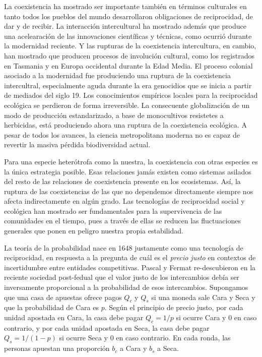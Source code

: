 \documentclass[a4paper,10pt]{book}
\theoremstyle{definition}
\begin{document}
La coexistencia ha mostrado ser importante tambi\'en en t\'erminos culturales en tanto todos los pueblos del mundo desarrollaron obligaciones de reciprocidad, de dar y de recibir.
%
La interacci\'on intercultural ha mostrado adem\'as que produce una acelearaci\'on de las innovaciones cient\'ificas y t\'ecnicas, como ocurri\'o durante la modernidad reciente.
%
Y las rupturas de la coexistencia intercultura, en cambio, han mostrado que producen procesos de involuci\'on cultural, como los registrados en Tasmania y en Europa occidental durante la Edad Media.
%
El proceso colonial asociado a la modernidad fue produciendo una ruptura de la coexistencia intercultral, especialmente aguda durante la era genocidios que se inicia a partir de mediados del siglo 19.
% 
Los conocimientos emp\'iricos locales para la reciprocidad ecol\'ogica se perdieron de forma irreversible.
%
La consecuente globalizaci\'on de un modo de producci\'on estandarizado, a base de monocultivos resistetes a herbicidas, est\'a produciendo ahora una ruptura de la coexistencia ecol\'ogica.
%
A pesar de todos los avances, la ciencia metropolitana moderna no es capaz de revertir la masiva p\'erdida biodiversidad actual.


Para una especie heter\'otrofa como la nuestra, la coexistencia con otras especies es la única estrategia posible.
%
Esas relaciones jam\'as existen como sistemas asilados del resto de las relaciones de coexistencia presente en los ecosistemas.
%
As\'i, la ruptura de las coexistencias de las que no dependemos directamente siempre nos afecta indirectamente en algún grado.
%
Las tecnolog\'ias de reciprocidad social y ecol\'ogica han mostrado ser fundamentales para la supervivencia de las comunidades en el tiempo, pues a trav\'es de ellas se reducen las fluctuaciones generales que ponen en peligro nuestra propia estabilidad.


La teor\'ia de la probabilidad nace en 1648 justamente como una tecnolog\'ia de reciprocidad, en respuesta a la pregunta de cu\'al es el \emph{precio justo} en contextos de incertidumbre entre entidades competitivas.
%
Pascal y Fermat re-descubieron en la reciente sociedad post-fedual que el valor justo de los intercambios deb\'ia ser inversamente proporcional a la probabilidad de esos intercambios.
%
Supongamos que una casa de apuestas ofrece pagos $Q_c$ y $Q_s$ si una moneda sale Cara y Seca y que la probabilidad de Cara es $p$.
%
Según el principio de precio justo, por cada unidad apostada en Cara, la casa debe pagar $Q_c = 1/p$ si ocurre Cara y $0$ en caso contrario, y por cada unidad apostada en Seca, la casa debe pagar $Q_s = 1/(1-p)$ si ocurre Seca y $0$ en caso contrario.
%
En cada ronda, las personas apuestan una proporci\'on $b_c$ a Cara y $b_s$ a Seca.
\end{document}
